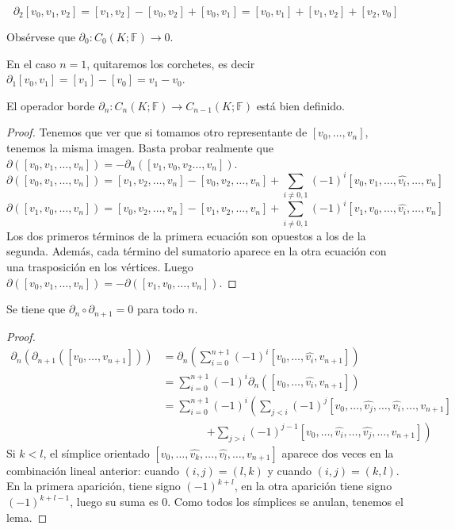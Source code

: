 \documentclass[HS.tex]{subfiles}
\begin{document}
\begin{ej}
\[ \partial_2[v_0,v_1,v_2] = [v_1,v_2] - [v_0,v_2] + [v_0,v_1] = [v_0,v_1] + [v_1,v_2] + [v_2,v_0] \]
\end{ej}

\begin{nota}
Obsérvese que $\partial_0 \colon C_0(K; \mathbb{F}) \to 0$.

En el caso $n=1$, quitaremos los corchetes, es decir $\partial_1[v_0,v_1] = [v_1]-[v_0] = v_1 - v_0$.
\end{nota}

\begin{lemma}
El operador borde $\partial_n \colon C_n(K; \mathbb{F}) \to C_{n-1}(K; \mathbb{F})$ está bien definido.
\end{lemma}
\begin{proof}
Tenemos que ver que si tomamos otro representante de $[v_0,\dots,v_n]$, tenemos la misma imagen.
Basta probar realmente que $\partial([v_0,v_1,\dots,v_n]) = -\partial_n([v_1,v_0,v_2\dots,v_n])$.
\[ \partial([v_0,v_1,\dots,v_n]) = [v_1,v_2,\dots,v_n]-[v_0,v_2,\dots,v_n] + \sum_{i\neq0,1}(-1)^i[v_0,v_1,\dots,\widehat{v_i},\dots,v_n]\]
\[ \partial([v_1,v_0,\dots,v_n]) = [v_0,v_2,\dots,v_n]-[v_1,v_2,\dots,v_n] + \sum_{i\neq0,1}(-1)^i[v_1,v_0,\dots,\widehat{v_i},\dots,v_n]\]
Los dos primeros términos de la primera ecuación son opuestos a los de la segunda. Además, cada término del sumatorio aparece en la otra ecuación con una trasposición en los vértices.
Luego $\partial([v_0,v_1,\dots,v_n]) = -\partial([v_1,v_0,\dots,v_n])$.
\end{proof}

\begin{lemma}
Se tiene que $\partial_n \circ \partial_{n+1} = 0$ para todo $n$.
\end{lemma}
\begin{proof}
\begin{align*}
\partial_n(\partial_{n+1}([v_0,\dots,v_{n+1}])) & = \partial_n \left(\sum_{i=0}^{n+1} (-1)^i [v_0,\dots,\widehat{v_i},v_{n+1}]\right)\\
& = \sum_{i=0}^{n+1} (-1)^i \partial_n([v_0,\dots,\widehat{v_i},v_{n+1}])\\
& = \sum_{i=0}^{n+1} (-1)^i \left(\sum_{j<i} (-1)^j [v_0,\dots,\widehat{v_j},\dots,\widehat{v_i},\dots,v_{n+1}]\right. \\
& \qquad\qquad \left.+ \sum_{j>i} (-1)^{j-1} [v_0,\dots,\widehat{v_i},\dots,\widehat{v_j},\dots,v_{n+1}]\right)
\end{align*}
Si $k < l$, el símplice orientado $[v_0,\dots,\widehat{v_k},\dots,\widehat{v_l},\dots,v_{n+1}]$ aparece dos veces en la combinación lineal anterior: cuando $(i,j)=(l,k)$ y cuando $(i,j)=(k,l)$.
En la primera aparición, tiene signo $(-1)^{k+l}$, en la otra aparición tiene signo $(-1)^{k+l-1}$, luego su suma es $0$.
Como todos los símplices se anulan, tenemos el lema.
\end{proof}
\end{document}
